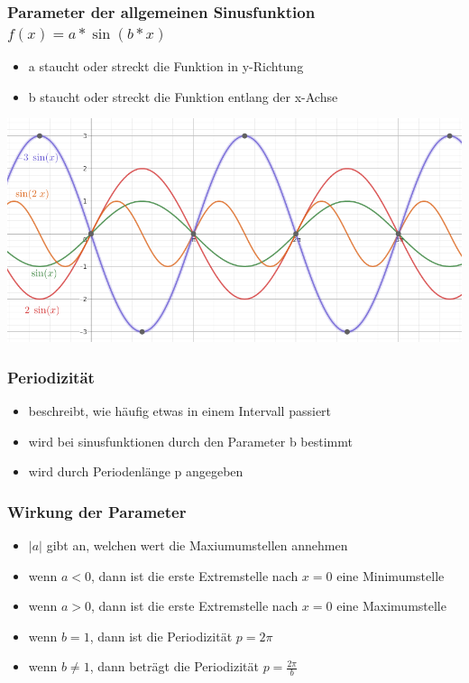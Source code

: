 \documentclass[12pt]{beamer}
\begin{document}
\begin{frame}
  \frametitle{Parameter der allgemeinen Sinusfunktion $f(x)=a*\sin(b*x)$}
  \begin{itemize}
    \item a staucht oder streckt die Funktion in y-Richtung
    \item b staucht oder streckt die Funktion entlang der x-Achse
  \end{itemize}
  \includegraphics[width=\textwidth]{sin}
\end{frame}
\begin{frame}
  \frametitle{Periodizität}
  \begin{itemize}
    \item beschreibt, wie häufig etwas in einem Intervall passiert
    \item wird bei sinusfunktionen durch den Parameter b bestimmt
    \item wird durch Periodenlänge p angegeben
  \end{itemize}
\end{frame}
\begin{frame}
  \frametitle{Wirkung der Parameter}
  \begin{itemize}
    \item $|a|$ gibt an, welchen wert die Maxiumumstellen annehmen
    \item wenn $a < 0$, dann ist die erste Extremstelle nach $x = 0$ eine Minimumstelle
    \item wenn $a > 0$, dann ist die erste Extremstelle nach $x = 0$ eine Maximumstelle
    \item wenn $b = 1$, dann ist die Periodizität $p = 2\pi$
    \item wenn $b \neq 1$, dann beträgt die Periodizität $p = \frac{2\pi}{b}$
  \end{itemize}
\end{frame}
\end{document}
